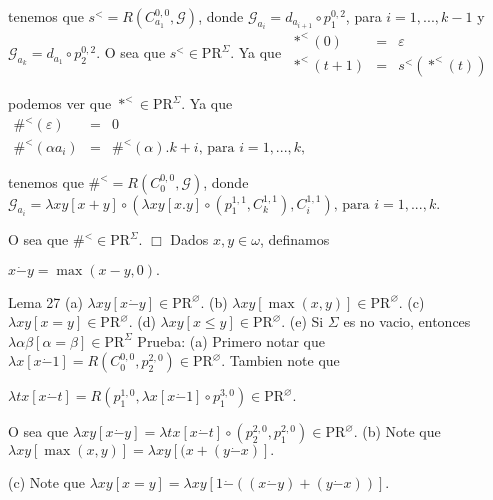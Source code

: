 tenemos que \(s^{< }=R\left( C_{a_{1}}^{0,0},\mathcal{G}\right) \), donde \( \mathcal{G}_{a_{i}}=d_{a_{i+1}}\circ p_{1}^{0,2}\), para \(i=1,...,k-1\) y \( \mathcal{G}_{a_{k}}=d_{a_{1}}\circ p_{2}^{0,2}.\) O sea que \(s^{< }\in \mathrm{ PR}^{\Sigma }.\) Ya que
\(\displaystyle \begin{array}{rcl} \ast ^{< }(0) & =& \varepsilon \\ \ast ^{< }(t+1) & =& s^{< }(\ast ^{< }(t)) \end{array} \)

podemos ver que \(\ast ^{< }\in \mathrm{PR}^{\Sigma }.\) Ya que
\(\displaystyle \begin{array}{rcl} \#^{< }(\varepsilon ) & =& 0 \\ \#^{< }(\alpha a_{i}) & =& \#^{< }(\alpha ).k+i\text{, para }i=1,...,k, \end{array} \)

tenemos que \(\#^{< }=R\left( C_{0}^{0,0},\mathcal{G}\right) \), donde
\(\displaystyle \mathcal{G}_{a_{i}}=\lambda xy\left[ x+y\right] \circ \left( \lambda xy\left[ x.y\right] \circ \left( p_{1}^{1,1},C_{k}^{1,1}\right) ,C_{i}^{1,1}\right) \text{, para }i=1,...,k\text{.} \)

O sea que \(\#^{< }\in \mathrm{PR}^{\Sigma }\). \(\Box\)
Dados \(x,y\in \omega \), definamos

\(\displaystyle x\dot{-}y=\max (x-y,0). \)

Lema 27
(a) \(\lambda xy\left[ x\dot{-}y\right] \in \mathrm{PR}^{\varnothing }.\)
(b) \(\lambda xy\left[ \max (x,y)\right] \in \mathrm{PR}^{\varnothing }.\)
(c) \(\lambda xy\left[ x=y\right] \in \mathrm{PR}^{\varnothing }.\)
(d) \(\lambda xy\left[ x\leq y\right] \in \mathrm{PR}^{\varnothing }.\)
(e) Si \(\Sigma \) es no vacio, entonces \(\lambda \alpha \beta \left[ \alpha =\beta \right] \in \mathrm{PR}^{\Sigma }\)
Prueba: (a) Primero notar que \(\lambda x\left[ x\dot{-}1\right] =R\left( C_{0}^{0,0},p_{2}^{2,0}\right) \in \mathrm{PR}^{\varnothing }.\) Tambien note que

\(\displaystyle \lambda tx\left[ x\dot{-}t\right] =R\left( p_{1}^{1,0},\lambda x\left[ x\dot{ -}1\right] \circ p_{1}^{3,0}\right) \in \mathrm{PR}^{\varnothing }. \)

O sea que \(\lambda xy\left[ x\dot{-}y\right] =\lambda tx\left[ x\dot{-}t \right] \circ \left( p_{2}^{2,0},p_{1}^{2,0}\right) \in \mathrm{PR} ^{\varnothing }.\)
(b) Note que \(\lambda xy\left[ \max (x,y)\right] =\lambda xy\left[ (x+(y\dot{ -}x)\right] .\)

(c) Note que \(\lambda xy\left[ x=y\right] =\lambda xy\left[ 1\dot{-}((x\dot{- }y)+(y\dot{-}x))\right] .\)

